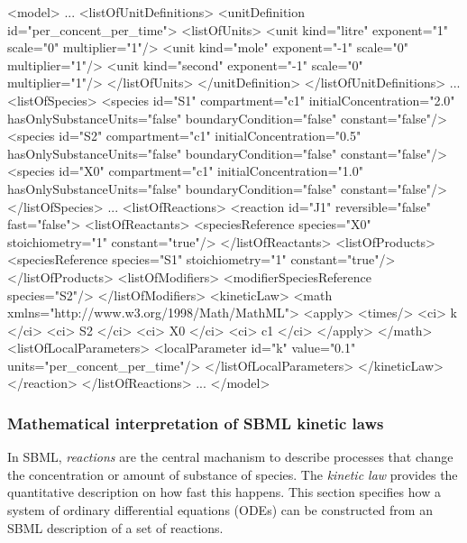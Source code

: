 \begin{example}
<model>
    ...
    <listOfUnitDefinitions>
        <unitDefinition id="per_concent_per_time">
            <listOfUnits>
                <unit kind="litre" exponent="1" scale="0" multiplier="1"/>
                <unit kind="mole"   exponent="-1" scale="0" multiplier="1"/>
                <unit kind="second" exponent="-1" scale="0" multiplier="1"/>
            </listOfUnits>
        </unitDefinition>
    </listOfUnitDefinitions>
    ...
    <listOfSpecies>
        <species id="S1" compartment="c1" initialConcentration="2.0" 
              hasOnlySubstanceUnits="false" boundaryCondition="false" constant="false"/>
        <species id="S2" compartment="c1" initialConcentration="0.5" 
              hasOnlySubstanceUnits="false" boundaryCondition="false" constant="false"/>
        <species id="X0" compartment="c1" initialConcentration="1.0" 
              hasOnlySubstanceUnits="false" boundaryCondition="false" constant="false"/>
    </listOfSpecies>
    ...
    <listOfReactions>
        <reaction id="J1" reversible="false" fast="false">
            <listOfReactants>
                <speciesReference species="X0" stoichiometry="1" constant="true"/>
            </listOfReactants>
            <listOfProducts>
                <speciesReference species="S1" stoichiometry="1" constant="true"/>
            </listOfProducts>
            <listOfModifiers>
                <modifierSpeciesReference species="S2"/>
            </listOfModifiers>
            <kineticLaw>
                <math xmlns="http://www.w3.org/1998/Math/MathML">
                    <apply>
                        <times/> <ci> k </ci> <ci> S2 </ci> <ci> X0 </ci> <ci> c1 </ci>
                    </apply>
                </math>
                <listOfLocalParameters>
                    <localParameter id="k" value="0.1" units="per_concent_per_time"/>
                </listOfLocalParameters>
            </kineticLaw>
        </reaction>
    </listOfReactions>
    ...
</model>
\end{example}



\subsubsection{Mathematical interpretation of SBML kinetic laws}
\label{sec:about-kinetic-laws}

In SBML, \emph{reactions} are the central machanism to describe processes that
change the concentration or amount of substance of species. The \emph{kinetic law} 
provides the quantitative description on how fast this happens. This section 
specifies how a system of ordinary differential equations (ODEs) can be constructed 
from an SBML description of a set of reactions.  

